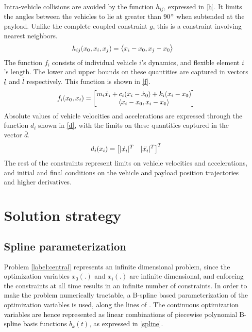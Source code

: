 \documentclass[letterpaper, 10 pt, conference]{ieeeconf}
\newcommand{\ubar}[1]{\text{\b{$#1$}}}
\begin{document}
\noindent
Intra-vehicle collisions are avoided by the function $h_{ij}$, expressed in \eqref{h}. It limits the angles between the vehicles to lie at greater than 90$\degree$ when subtended at the payload. Unlike the complete coupled constraint $g$, this is a constraint involving nearest neighbors.
 \begin{equation}\label{h}
\begin{aligned}
h_{ij}(x_0,x_i,x_j) &= \mathlarger{\langle} x_i - x_0,x_j - x_0 \mathlarger{\rangle}
\end{aligned}
\end{equation}
The function $f_i$ consists of individual vehicle $i$'s dynamics, and flexible element $i$'s length. The lower and upper bounds on these quantities are captured in vectors $\ubar{l}$ and $\bar{l}$ respectively. This function is shown in \eqref{f}.
 \begin{equation}\label{f}
 \begin{aligned}
 f_i(x_0,x_i) &=
 \begin{bmatrix}
   m_i\ddot{x}_i + c_i(\dot{x}_i-\dot{x}_0) + k_i(x_i-x_0) \\
  \mathlarger{\langle} x_i - x_0,x_i - x_0 \mathlarger{\rangle}
 \end{bmatrix} \\
 \end{aligned}
 \end{equation}
 Absolute values of vehicle velocities and accelerations are expressed through the function $d_i$ shown in \eqref{d}, with the limits on these quantities captured in the vector $\bar{d}$.
 \begin{equation}\label{d}
 \begin{aligned}
 d_i(x_i) &=
 \begin{bmatrix}
  \mathlarger{|}\dot{x_i}\mathlarger{|}^T &\mathlarger{|}\ddot{x_i}\mathlarger{|}^T
 \end{bmatrix}^T \\
 \end{aligned}
 \end{equation}
 The rest of the constraints represent limits on vehicle velocities and accelerations, and initial and final conditions on the vehicle and payload position trajectories and higher derivatives.
\section{Solution strategy}
\subsection{Spline parameterization}
Problem \eqref{label:central} represents an infinite dimensional problem, since the optimization variables $x_0(.)$ and $x_i(.)$ are infinite dimensional, and enforcing the constraints at all time results in an infinite number of constraints. In order to make the problem numerically tractable, a B-spline based parameterization of the optimization variables is used, along the lines of \cite{c15}. The continuous optimization variables are hence represented as linear combinations of piecewise polynomial B-spline basis functions $b_k(t)$, as expressed in \eqref{spline}.
\end{document}
